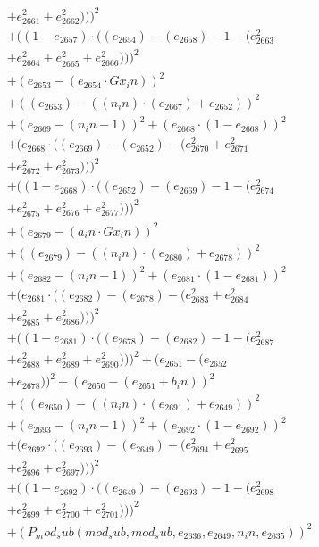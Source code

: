 \documentclass[10pt, a4paper]{article}
\begin{document}
\begin{small}
\begin{align*}
& + e_{2661}^{2} + e_{2662}^{2})))^{2} \\
& + ((1 - e_{2657})  \cdot  ((e_{2654}) - (e_{2658}) - 1 - (e_{2663}^{2} \\
& + e_{2664}^{2} + e_{2665}^{2} + e_{2666}^{2})))^{2} \\
& + (e_{2653} - (e_{2654}  \cdot  Gx_in))^{2} \\
& + ((e_{2653}) - ((n_in)  \cdot  (e_{2667}) + e_{2652}))^{2} \\
& + (e_{2669} - (n_in - 1))^{2} + (e_{2668}  \cdot  (1 - e_{2668}))^{2} \\
& + (e_{2668}  \cdot  ((e_{2669}) - (e_{2652}) - (e_{2670}^{2} + e_{2671}^{2} \\
& + e_{2672}^{2} + e_{2673}^{2})))^{2} \\
& + ((1 - e_{2668})  \cdot  ((e_{2652}) - (e_{2669}) - 1 - (e_{2674}^{2} \\
& + e_{2675}^{2} + e_{2676}^{2} + e_{2677}^{2})))^{2} \\
& + (e_{2679} - (a_in  \cdot  Gx_in))^{2} \\
& + ((e_{2679}) - ((n_in)  \cdot  (e_{2680}) + e_{2678}))^{2} \\
& + (e_{2682} - (n_in - 1))^{2} + (e_{2681}  \cdot  (1 - e_{2681}))^{2} \\
& + (e_{2681}  \cdot  ((e_{2682}) - (e_{2678}) - (e_{2683}^{2} + e_{2684}^{2} \\
& + e_{2685}^{2} + e_{2686}^{2})))^{2} \\
& + ((1 - e_{2681})  \cdot  ((e_{2678}) - (e_{2682}) - 1 - (e_{2687}^{2} \\
& + e_{2688}^{2} + e_{2689}^{2} + e_{2690}^{2})))^{2} + (e_{2651} - (e_{2652} \\
& + e_{2678}))^{2} + (e_{2650} - (e_{2651} + b_in))^{2} \\
& + ((e_{2650}) - ((n_in)  \cdot  (e_{2691}) + e_{2649}))^{2} \\
& + (e_{2693} - (n_in - 1))^{2} + (e_{2692}  \cdot  (1 - e_{2692}))^{2} \\
& + (e_{2692}  \cdot  ((e_{2693}) - (e_{2649}) - (e_{2694}^{2} + e_{2695}^{2} \\
& + e_{2696}^{2} + e_{2697}^{2})))^{2} \\
& + ((1 - e_{2692})  \cdot  ((e_{2649}) - (e_{2693}) - 1 - (e_{2698}^{2} \\
& + e_{2699}^{2} + e_{2700}^{2} + e_{2701}^{2})))^{2} \\
& + (P_mod_sub(mod_sub, mod_sub, e_{2636}, e_{2649}, n_in, e_{2635}))^{2} \\

\end{align*}
\end{small}
\end{document}
